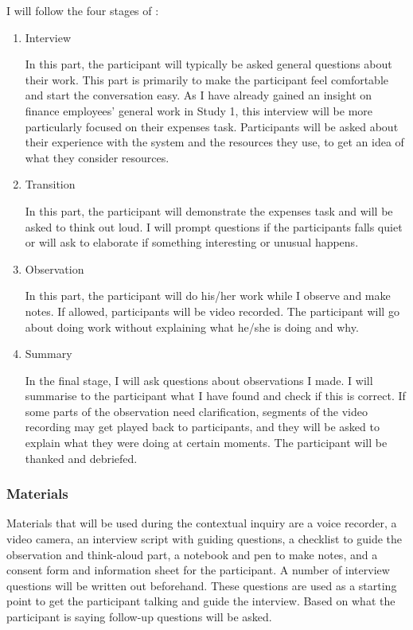 I will follow the four stages of \citet{Beyer1998}:
\begin{enumerate}
\item 
Interview

In this part, the participant will typically be asked general questions about their work. This part is primarily to make the participant feel comfortable and start the conversation easy. As I have already gained an insight on finance employees' general work in Study 1, this interview will be more particularly focused on their expenses task. Participants will be asked about their experience with the system  and the resources they use, to get an idea of what they consider resources.
\item 
Transition

In this part, the participant will demonstrate the expenses task and will be asked to think out loud. I will prompt questions if the participants falls quiet or will ask to elaborate if something interesting or unusual happens.
\item 
Observation

In this part, the participant will do his/her work while I observe and make notes. If allowed, participants will be video recorded. The participant will go about doing work without explaining what he/she is doing and why. 
\item 
Summary

In the final stage, I will ask questions about observations I made. I will summarise to the participant what I have found and check if this is correct. If some parts of the observation need clarification, segments of the video recording may get played back to participants, and they will be asked to explain what they were doing at certain moments.
The participant will be thanked and debriefed.
\end{enumerate}

\subsubsection{Materials}
Materials that will be used during the contextual inquiry are a voice recorder, a video camera, an interview script with guiding questions, a checklist to guide the observation and think-aloud part, a notebook and pen to make notes, and a consent form and information sheet for the participant.
A number of interview questions will be written out beforehand. These questions are used as a starting point to get the participant talking and guide the interview. Based on what the participant is saying follow-up questions will be asked. 


